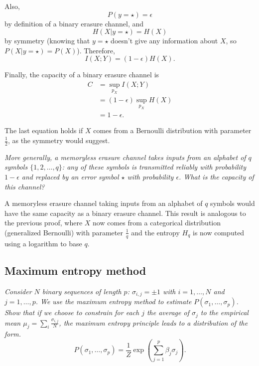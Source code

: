 \documentclass[12pt]{article}
\begin{document}
  Also,
  \begin{equation}
    P(y = \star) = \epsilon
  \end{equation}
  by definition of a binary erasure channel, and
  \begin{equation}
    H(X |y = \star) = H(X)
  \end{equation}
  by symmetry (knowing that $y = \star$ doesn't give any information about $X$,
  so $P(X | y = \star) = P(X)$). Therefore,
  \begin{equation}
    I(X; Y) = (1 - \epsilon)H(X).
  \end{equation}

  Finally, the capacity of a binary erasure channel is
  \begin{equation}
    \begin{split}
      C &= \sup_{p_X} I(X; Y)\\
      &= (1 - \epsilon) \sup_{p_X} H(X)\\
      &= 1 - \epsilon.
    \end{split}
  \end{equation}

  The last equation holds if $X$ comes from a Bernoulli distribution with
  parameter $\frac{1}{2}$, as the symmetry would suggest.

  \begin{displayquote}
    \itshape{}
    More generally, a memoryless erasure channel takes inputs from an alphabet
    of $q$ symbols $\{1, 2, \dots, q\}$: any of these symbols is transmitted
    reliably with probability $1-\epsilon$ and replaced by an error symbol
    $\star$ with probability $\epsilon$. What is the capacity of this channel?
  \end{displayquote}

  A memoryless erasure channel taking inputs from an alphabet of $q$ symbols
  would have the same capacity as a binary erasure channel. This result is
  analogous to the previous proof, where $X$ now comes from a categorical
  distribution (generalized Bernoulli) with parameter $\frac{1}{q}$ and the
  entropy $H_q$ is now computed using a logarithm to base $q$.

  \subsection{Maximum entropy method}

  \begin{displayquote}
    \itshape{}
    Consider $N$ binary sequences of length $p$: $\sigma_{i, j} = \pm 1$ with
    $i = 1, \dots, N$ and $j = 1, \dots , p$. We use the maximum entropy method
    to estimate $P(\sigma_1, \dots, \sigma_p)$. Show that if we choose to
    constrain for each $j$ the average of $\sigma_j$ to the empirical mean
    $\mu_j = \sum_i \frac{\sigma_{i, j}}{N}$, the maximum entropy principle
    leads to a distribution of the form.
    \begin{equation}
      P(\sigma_1, \dots, \sigma_p) = \frac{1}{Z}\exp\left(\sum_{j = 1}^p \beta_j
        \sigma_j\right).
    \end{equation}
  \end{displayquote}
\end{document}
